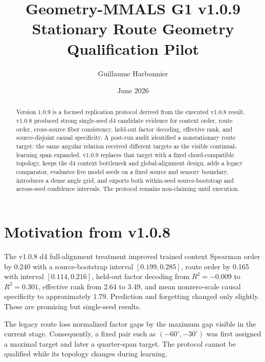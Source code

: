 \documentclass[10pt]{article}
\title{Geometry-MMALS G1 v1.0.9\\Stationary Route Geometry Qualification Pilot}
\author{Guillaume Harbonnier}
\date{June 2026}
\begin{document}
\maketitle
\begin{abstract}
Version 1.0.9 is a focused replication protocol derived from the executed v1.0.8 result. v1.0.8 produced strong single-seed d4 candidate evidence for context order, route order, cross-source fiber consistency, held-out factor decoding, effective rank, and source-disjoint causal specificity. A post-run audit identified a nonstationary route target: the same angular relation received different targets as the visible continual-learning span expanded. v1.0.9 replaces that target with a fixed chord-compatible topology, keeps the d4 context bottleneck and global-alignment design, adds a legacy comparator, evaluates five model seeds on a fixed source and sensory boundary, introduces a dense angle grid, and exports both within-seed source-bootstrap and across-seed confidence intervals. The protocol remains non-claiming until execution.
\end{abstract}

\section{Motivation from v1.0.8}
The v1.0.8 d4 full-alignment treatment improved trained context Spearman order by 0.240 with a source-bootstrap interval $[0.199,0.285]$, route order by 0.165 with interval $[0.114,0.216]$, held-out factor decoding from $R^2=-0.009$ to $R^2=0.301$, effective rank from 2.64 to 3.49, and mean nonzero-scale causal specificity to approximately 1.79. Prediction and forgetting changed only slightly. These are promising but single-seed results.

The legacy route loss normalized factor gaps by the maximum gap visible in the current stage. Consequently, a fixed pair such as $(-60^\circ,-30^\circ)$ was first assigned a maximal target and later a quarter-span target. The protocol cannot be qualified while its topology changes during learning.
\end{document}

